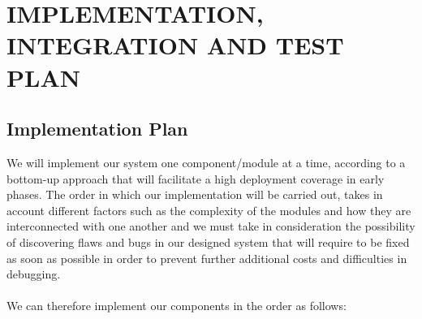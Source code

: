 \documentclass[12pt,a4paper]{article}
\begin{document}
\section{IMPLEMENTATION, INTEGRATION AND TEST PLAN}
\subsection{Implementation Plan}
We will implement our system one component/module at a time, according to a bottom-up approach that will facilitate a high deployment coverage in early phases. The order in which our implementation will be carried out, takes in account different factors such as the complexity of the modules and how they are interconnected with one another and we must take in consideration the possibility of discovering flaws and bugs in our designed system that will require to be fixed as soon as possible in order to prevent further additional costs and difficulties in debugging.\\\\
We can therefore implement our components in the order as follows:
\end{document}
